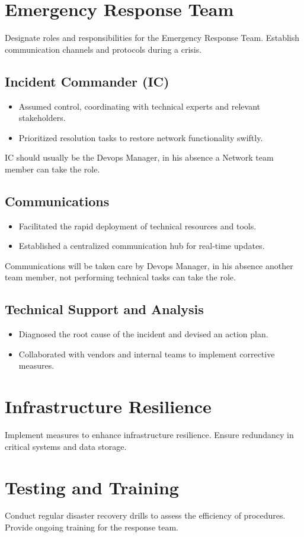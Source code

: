 \section{Emergency Response Team}
Designate roles and responsibilities for the Emergency Response Team.
Establish communication channels and protocols during a crisis.
\subsection{Incident Commander (IC)}

\begin{itemize}
    \item Assumed control, coordinating with technical experts and relevant stakeholders.
    \item Prioritized resolution tasks to restore network functionality swiftly.
\end{itemize}

IC should usually be the Devops Manager, in his absence a Network team member can take the role.

\subsection{Communications}

\begin{itemize}
    \item Facilitated the rapid deployment of technical resources and tools.
    \item Established a centralized communication hub for real-time updates.
\end{itemize}

Communications will be taken care by Devops Manager, in his absence another team member, not performing technical tasks can take the role.

\subsection{Technical Support and Analysis}

\begin{itemize}
    \item Diagnosed the root cause of the incident and devised an action plan.
    \item Collaborated with vendors and internal teams to implement corrective measures.
\end{itemize}

\section{Infrastructure Resilience}
Implement measures to enhance infrastructure resilience.
Ensure redundancy in critical systems and data storage.

\section{Testing and Training}
Conduct regular disaster recovery drills to assess the efficiency of procedures.
Provide ongoing training for the response team.